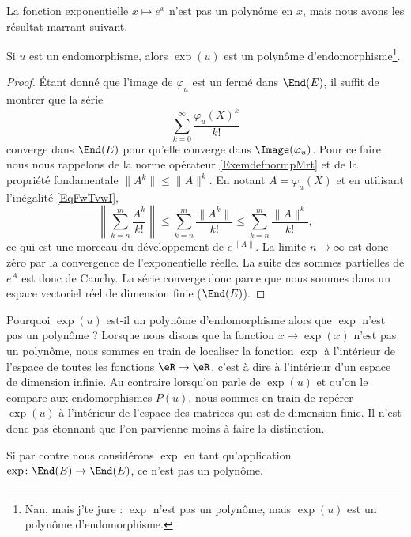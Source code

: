 La fonction exponentielle \(  x\mapsto e^{x}\) n'est pas un polynôme en \( x\), mais nous avons les résultat marrant suivant.
\begin{proposition} \label{PropFMqsIE}
    Si \( u\) est un endomorphisme, alors \( \exp(u)\) est un polynôme d'endomorphisme\footnote{Nan, mais j'te jure : \( \exp\) n'est pas un polynôme, mais $\exp(u)$ est un polynôme d'endomorphisme.}.
\end{proposition}

\begin{proof}
    Étant donné que l'image de \( \varphi_u\) est un fermé dans \( \End(E)\), il suffit de montrer que la série
    \begin{equation}
        \sum_{k=0}^{\infty}\frac{ \varphi_u(X)^k }{ k! }
    \end{equation}
    converge dans \( \End(E)\) pour qu'elle converge dans \( \Image(\varphi_u)\). Pour ce faire nous nous rappelons de la norme opérateur \eqref{ExemdefnormpMrt} et de la propriété fondamentale \( \| A^k \|\leq \| A \|^k\). En notant \( A=\varphi_u(X)\) et en utilisant l'inégalité \eqref{EqFwTvwI},
    \begin{equation}
        \left\| \sum_{k=n}^m\frac{ A^k }{ k! } \right\|\leq \sum_{k=n}^m\frac{ \| A^k \| }{ k! }\leq \sum_{k=n}^m\frac{ \| A \|^k }{ k! },
    \end{equation}
    ce qui est une morceau du développement de \(  e^{\| A \|}\). La limite \( n\to\infty\) est donc zéro par la convergence de l'exponentielle réelle. La suite des sommes partielles de  $e^{A}$ est donc de Cauchy. La série converge donc parce que nous sommes dans un espace vectoriel réel de dimension finie (\( \End(E)\)).
\end{proof}

\begin{remark}
    Pourquoi \( \exp(u)\) est-il un polynôme d'endomorphisme alors que \( \exp\) n'est pas un polynôme ? Lorsque nous disons que la fonction \( x\mapsto \exp(x)\) n'est pas un polynôme, nous sommes en train de localiser la fonction \( \exp\) à l'intérieur de l'espace de toutes les fonctions \( \eR\to \eR\), c'est à dire à l'intérieur d'un espace de dimension infinie. Au contraire lorsqu'on parle de \( \exp(u)\) et qu'on le compare aux endomorphismes \( P(u)\), nous sommes en train de repérer \( \exp(u)\) à l'intérieur de l'espace des matrices qui est de dimension finie. Il n'est donc pas étonnant que l'on parvienne moins à faire la distinction.

    Si par contre nous considérons \( \exp\) en tant qu'application \( \exp\colon \End(E)\to \End(E)\), ce n'est pas un polynôme.
\end{remark}

